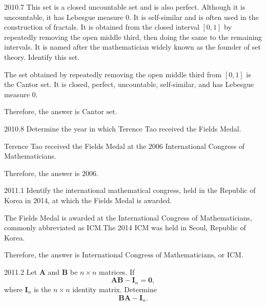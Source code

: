     \begin{pastproblem}{2010.7}
        This set is a closed uncountable set and is also perfect. Although it is uncountable, it has
        Lebesgue measure $0$. It is self-similar and is often used in the construction of fractals.
        It is obtained from the closed interval $[0,1]$ by repeatedly removing the open middle
        third, then doing the same to the remaining intervals. It is named after the mathematician
        widely known as the founder of set theory. Identify this set.
    \end{pastproblem}

    \begin{solution}
        The set obtained by repeatedly removing the open middle third from $[0,1]$ is the Cantor
        set. It is closed, perfect, uncountable, self-similar, and has Lebesgue measure $0$.

        Therefore, the answer is $\boxed{\text{Cantor set}}$.
    \end{solution}

    \begin{pastproblem}{2010.8}
        Determine the year in which Terence Tao received the Fields Medal.
    \end{pastproblem}

    \begin{solution}
        Terence Tao received the Fields Medal at the 2006 International Congress of Mathematicians.

        Therefore, the answer is $\boxed{2006}$.
    \end{solution}

    \begin{pastproblem}{2011.1}
        Identify the international mathematical congress, held in the Republic of Korea in 2014, at which the
        Fields Medal is awarded.
    \end{pastproblem}

    \begin{solution}
        The Fields Medal is awarded at the International Congress of Mathematicians, commonly
        abbreviated as ICM.\@ The 2014 ICM was held in Seoul, Republic of Korea.

        Therefore, the answer is $\boxed{\text{International Congress of Mathematicians, or ICM}}$.
    \end{solution}

    \begin{pastproblem}{2011.2}
        Let $\mathbf{A}$ and $\mathbf{B}$ be $n\times n$ matrices. If
        \[
            \mathbf{A}\mathbf{B}-\mathbf{I}_n=\mathbf{0},
        \]
        where $\mathbf{I}_n$ is the $n\times n$ identity matrix. Determine
        \[
            \mathbf{B}\mathbf{A}-\mathbf{I}_n.
        \]
    \end{pastproblem}

